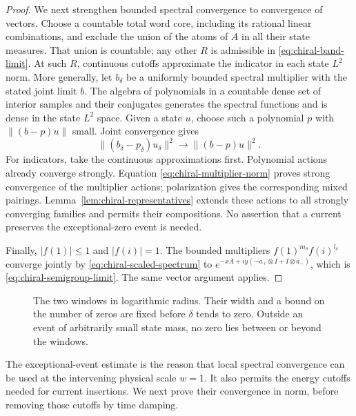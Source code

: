 \begin{proof}
We next strengthen bounded spectral convergence to convergence of vectors.
Choose a countable total word core, including its rational linear
combinations, and exclude the union of the atoms of $A$ in all their state
measures. That union is countable; any other $R$ is admissible in
\eqref{eq:chiral-band-limit}. At such $R$, continuous cutoffs approximate
the indicator in each state $L^2$ norm. More generally, let $b_\delta$ be
a uniformly bounded spectral multiplier with the stated joint limit $b$.
The algebra of polynomials in a countable dense set of interior samples
and their conjugates generates the spectral functions and is dense in
the state $L^2$ space. Given a state $u$, choose such a polynomial $p$ with
$\|(b-p)u\|$ small. Joint convergence gives
\begin{equation}\label{eq:chiral-multiplier-norm}
 \|(b_\delta-p_\delta)u_\delta\|^2
          \longrightarrow\|(b-p)u\|^2.
\end{equation}
For indicators, take the continuous approximations first. Polynomial
actions already converge strongly. Equation
\eqref{eq:chiral-multiplier-norm} proves strong convergence of the
multiplier actions; polarization gives the corresponding mixed pairings.
Lemma~\ref{lem:chiral-representatives} extends these actions to all
strongly converging families and permits their compositions. No assertion
that a current preserves the exceptional-zero event is needed.

Finally, $|f(1)|\le1$ and $|f(i)|=1$. The bounded multipliers
$f(1)^{m_\delta}f(i)^{l_\delta}$ converge jointly by
\eqref{eq:chiral-scaled-spectrum} to
$e^{-xA+iy(-a_+\otimes I+I\otimes a_-)}$, which is
\eqref{eq:chiral-semigroup-limit}. The same vector argument applies.
\end{proof}

\begin{figure}[htbp]
\centering

\caption{The two windows in logarithmic radius. Their width and a bound
on the number of zeros are fixed before $\delta$ tends to zero. Outside
an event of arbitrarily small state mass, no zero lies between or beyond
the windows.}
\label{fig:chiral-windows}
\end{figure}

The exceptional-event estimate is the reason that local spectral convergence
can be used at the intervening physical scale $w=1$. It also permits the
energy cutoffs needed for current insertions. We next prove their convergence
in norm, before removing those cutoffs by time damping.

